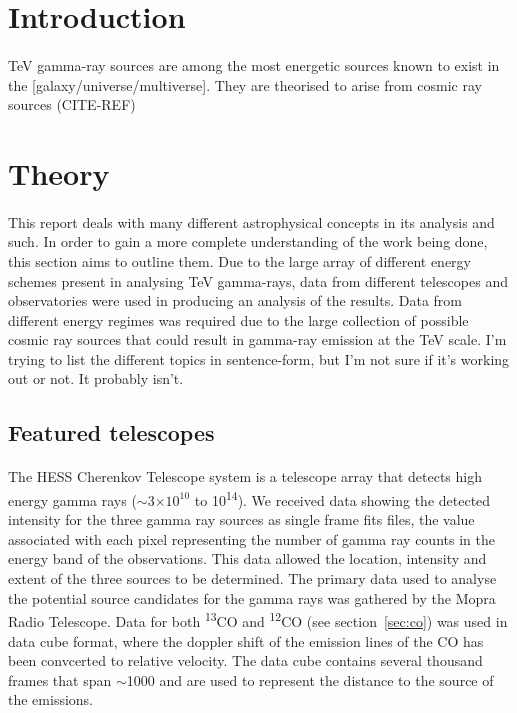 \documentclass[a4paper, titlepage, oneside]{article}
\newcommand{\elem}[2]{\textsuperscript{#1}{#2}}
\newcommand{\e}[1]{\ensuremath{\times 10^{#1}}}
\begin{document}
\begin{multicols}{2}
\section{Introduction}
\paragraph{}
TeV gamma-ray sources are among the most energetic sources known to exist in the [galaxy/universe/multiverse]. They are theorised to arise from cosmic ray sources (CITE-REF)

\section{Theory}
\paragraph{}
This report deals with many different astrophysical concepts in its analysis and such. In order to gain a more complete understanding of the work being done, this section aims to outline them. Due to the large array of different energy schemes present in analysing TeV gamma-rays, data from different telescopes and observatories were used in producing an analysis of the results. Data from different energy regimes was required due to the large collection of possible cosmic ray sources that could result in gamma-ray emission at the TeV scale. I'm trying to list the different topics in sentence-form, but I'm not sure if it's working out or not. It probably isn't.

\subsection{Featured telescopes}
\paragraph{}
The HESS Cherenkov Telescope system is a telescope array that detects high energy gamma rays (\(\sim\)\(3\e{10}\) to \unit{10^{14}}{\electronvolt}). We received data showing the detected intensity for the three gamma ray sources as single frame fits files, the value associated with each pixel representing the number of gamma ray counts in the energy band of the observations. This data allowed the location, intensity and extent of the three sources to be determined. The primary data used to analyse the potential source candidates for the gamma rays was gathered by the Mopra Radio Telescope. Data for both \elem{13}{C}O and \elem{12}{C}O (see section~\ref{sec:co}) was used in data cube format, where the doppler shift of the emission lines of the CO has been convcerted to relative velocity. The data cube contains several thousand frames that span \(\sim\)\unit{1000}{\kilo\meter\cdot\reciprocal\second} and are used to represent the distance to the source of the emissions.


\end{multicols}
\end{document}
